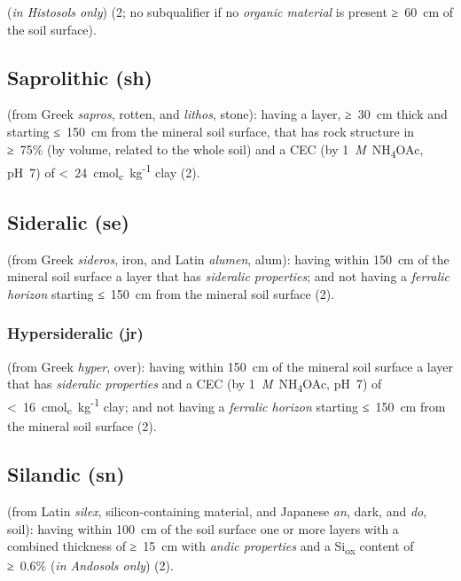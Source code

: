 \documentclass[
  letterpaper,
  DIV=11,
  numbers=noendperiod]{scrreprt}
\begin{document}
(\emph{in Histosols only}) (2; no subqualifier if no \emph{organic
material} is present ≥~60~cm of the soil surface).

\hypertarget{saprolithic-sh}{%
\subsection{Saprolithic (sh)}\label{saprolithic-sh}}

(from Greek \emph{sapros}, rotten, and \emph{lithos}, stone): having a
layer, ≥~30~cm thick and starting ≤~150~cm from the mineral soil
surface, that has rock structure in ≥~75\% (by volume, related to the
whole soil) and a CEC (by 1~\emph{M}~NH\textsubscript{4}OAc, pH~7) of
\textless~24~cmol\textsubscript{c}~kg\textsuperscript{-1} clay (2).

\hypertarget{sideralic-se}{%
\subsection{Sideralic (se)}\label{sideralic-se}}

(from Greek \emph{sideros}, iron, and Latin \emph{alumen}, alum): having
within 150~cm of the mineral soil surface a layer that has
\emph{sideralic properties}; and not having a \emph{ferralic horizon}
starting ≤~150~cm from the mineral soil surface (2).

\hypertarget{hypersideralic-jr}{%
\subsubsection{Hypersideralic (jr)}\label{hypersideralic-jr}}

(from Greek \emph{hyper}, over): having within 150~cm of the mineral
soil surface a layer that has \emph{sideralic properties} and a CEC (by
1~\emph{M}~NH\textsubscript{4}OAc, pH~7) of
\textless~16~cmol\textsubscript{c}~kg\textsuperscript{-1} clay; and not
having a \emph{ferralic horizon} starting ≤~150~cm from the mineral soil
surface (2).

\hypertarget{silandic-sn}{%
\subsection{Silandic (sn)}\label{silandic-sn}}

(from Latin \emph{silex}, silicon-containing material, and Japanese
\emph{an}, dark, and \emph{do}, soil): having within 100~cm of the soil
surface one or more layers with a combined thickness of ≥~15~cm with
\emph{andic properties} and a Si\textsubscript{ox} content of ≥~0.6\%
(\emph{in Andosols only}) (2).
\end{document}
